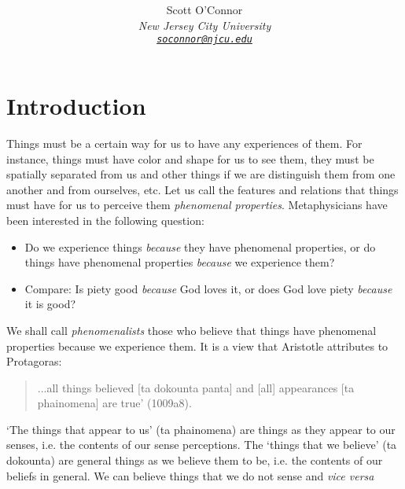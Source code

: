 \documentclass[article,oneside]{memoir}
\makeatletter
\def\myaffiliation{New Jersey City University}
\def\myauthor{Scott O'Connor}
\def\myemail{\small{\texttt{\href{mailto:soconnor@njcu.edu}{soconnor@njcu.edu}}}}
\def\mytitle{Phenomenalism}
\makeatother
\begin{document}
\setsansfont[Mapping=tex-text]{Myriad Pro}  
\setmonofont[Mapping=tex-text,Scale=MatchLowercase]{Minion Pro} 
\pagestyle{kjh}

\title{\bigskip \bigskip {{\mytitle}} }

\author{\myauthor \\
 \emph{\myaffiliation \\ 
  \myemail }}


\maketitle

\section{Introduction}

Things must be a certain way for us to have any experiences of them. For instance, things must have color and shape for us to see them, they must be spatially separated from us and other things if we are distinguish them from one another and from ourselves, etc. Let us call the features and relations that things must have for us to perceive them \emph{phenomenal properties}. Metaphysicians have been interested in the following question: 
\begin{itemize}
\item Do we experience things  \emph{because} they have phenomenal properties, or do things have phenomenal properties \emph{because} we experience them?
\item Compare: Is piety good \emph{because} God loves it, or does God love piety \emph{because} it is good? 
\end{itemize} 
We shall call \emph{phenomenalists} those who believe that things have phenomenal properties because we experience them.  It is a view that Aristotle attributes to Protagoras: 
\begin{quote}
...all things believed [ta dokounta panta] and [all] appearances [ta phainomena] are true’ (1009a8).
\end{quote}
`The things that appear to us' (ta phainomena) are things as they appear to our senses, i.e. the contents of our sense perceptions. The `things that we believe’ (ta dokounta) are general things as we believe them to be, i.e. the contents of our beliefs in general. We can believe things that we do not sense and \emph{vice versa} 
\end{document}
